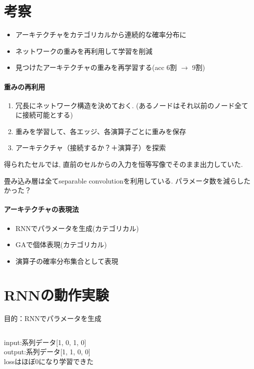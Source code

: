 \documentclass[twocolumn]{jarticle}     %
\begin{document}
\section{考察}

\begin{itemize}
  \item アーキテクチャをカテゴリカルから連続的な確率分布に
  \item ネットワークの重みを再利用して学習を削減
  \item 見つけたアーキテクチャの重みを再学習する(acc 6割 $\rightarrow$ 9割)
\end{itemize}

\paragraph{重みの再利用}
\begin{enumerate}
  \item 冗長にネットワーク構造を決めておく. (あるノードはそれ以前のノード全てに接続可能とする)
  \item 重みを学習して、各エッジ、各演算子ごとに重みを保存
  \item アーキテクチャ（接続するか？＋演算子）を探索
\end{enumerate}

得られたセルでは,
直前のセルからの入力を恒等写像でそのまま出力していた.

畳み込み層は全てseparable convolutionを利用している. パラメータ数を減らしたかった？

\paragraph{アーキテクチャの表現法}
\begin{itemize}
  \item RNNでパラメータを生成(カテゴリカル)
  \item GAで個体表現(カテゴリカル)
  \item 演算子の確率分布集合として表現
\end{itemize}

\section{RNNの動作実験}
目的：RNNでパラメータを生成

\subsection{}
input:系列データ[1, 0, 1, 0]\\
output:系列データ[1, 1, 0, 0]\\
lossはほぼ0になり学習できた
\end{document}
